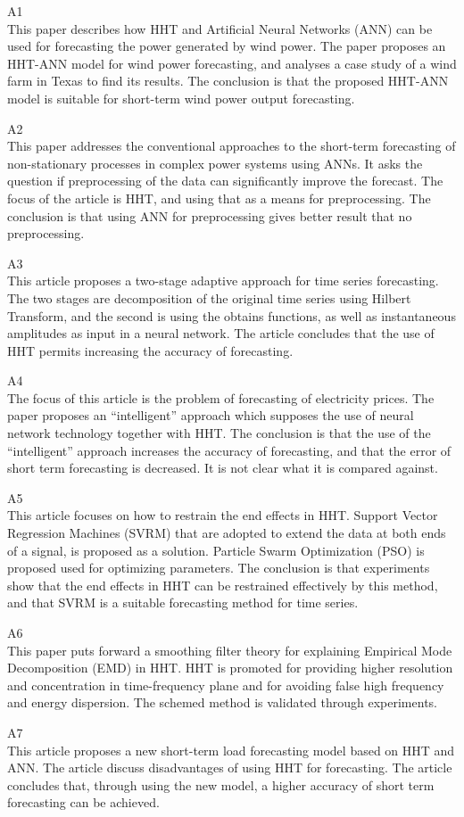 \begin{description}
\item A1 \hfill \\
This paper describes how HHT and Artificial Neural Networks (ANN) can be used for forecasting the power generated by wind power. The paper proposes an HHT-ANN model for wind power forecasting, and analyses a case study of a wind farm in Texas to find its results. The conclusion is that the proposed HHT-ANN model is suitable for short-term wind power output forecasting. 
\item A2 \hfill \\
This paper addresses the conventional approaches to the short-term forecasting of non-stationary processes in complex power systems using ANNs. It asks the question if preprocessing of the data can significantly improve the forecast. The focus of the article is HHT, and using that as a means for preprocessing. The conclusion is that using ANN for preprocessing gives better result that no preprocessing. 
\item A3 \hfill \\
This article proposes a two-stage adaptive approach for time series forecasting. The two stages are decomposition of the original time series using Hilbert Transform, and the second is using the obtains functions, as well as instantaneous amplitudes as input in a neural network. The article concludes that the use of HHT permits increasing the accuracy of forecasting. 
\item A4 \hfill \\
The focus of this article is the problem of forecasting of electricity prices. The paper proposes an ``intelligent'' approach which supposes the use of neural network technology together with HHT. The conclusion is that the use of the ``intelligent'' approach increases the accuracy of forecasting, and that the error of short term forecasting is decreased. It is not clear what it is compared against. 
\item A5 \hfill \\
This article focuses on how to restrain the end effects in HHT. Support Vector Regression Machines (SVRM) that are adopted to extend the data at both ends of a signal, is proposed as a solution. Particle Swarm Optimization (PSO) is proposed used for optimizing parameters. The conclusion is that experiments show that the end effects in HHT can be restrained effectively by this method, and that SVRM is a suitable forecasting method for time series. 
\item A6 \hfill \\
This paper puts forward a smoothing filter theory for explaining Empirical Mode Decomposition (EMD) in HHT. HHT is promoted for providing higher resolution and concentration in time-frequency plane and for avoiding false high frequency and energy dispersion. The schemed method is validated through experiments. 
\item A7 \hfill \\
This article proposes a new short-term load forecasting model based on HHT and ANN. The article discuss disadvantages of using HHT for forecasting. The article concludes that, through using the new model, a higher accuracy of short term forecasting can be achieved.


\end{description}
